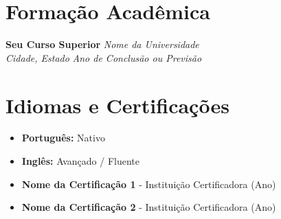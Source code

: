\documentclass[a4paper,11pt]{article}
\newcommand{\resumeEntry}[4]{
  \vspace{4pt}
  \textbf{#1} \hfill \textit{#2} \\
  \textit{#3} \hfill \textit{#4} \\
}
\begin{document}

\section{Formação Acadêmica}

\resumeEntry
  {Seu Curso Superior} %
  {Nome da Universidade} %
  {Cidade, Estado} %
  {Ano de Conclusão ou Previsão} %


\section{Idiomas e Certificações}
\begin{itemize}[leftmargin=*, label={}]
    \item \textbf{Português:} Nativo
    \item \textbf{Inglês:} Avançado / Fluente
    \item \textbf{Nome da Certificação 1} - Instituição Certificadora (Ano)
    \item \textbf{Nome da Certificação 2} - Instituição Certificadora (Ano)
\end{itemize}
\end{document}

